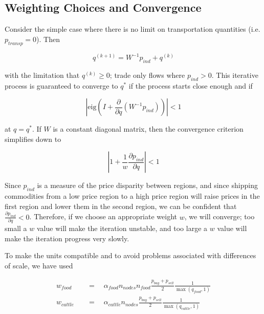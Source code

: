 \documentclass[letter,12pt]{article}
\begin{document}
\subsection{Weighting Choices and Convergence}

Consider the simple case where there is no limit on transportation quantities (i.e. $p_{transp} = 0$).  Then

\begin{equation}
q^{\left(k+1\right)} = W^{-1} p_{ind} + q^{\left(k\right)}
\end{equation}

\noindent with the limitation that $q^{\left(k\right)} \geq 0$; trade only flows where $p_{ind} > 0$.  This iterative process is guaranteed to converge to $q^*$ if the process starts close enough and if 

\begin{equation}
\left| \text{eig} \left(I + \frac{\partial}{\partial q} \left(W^{-1} p_{ind}\right) \right) \right| < 1
\end{equation}

\noindent at $q = q^*$.  If $W$ is a constant diagonal matrix, then the convergence criterion simplifies down to

\begin{equation}
\left| 1 + \frac{1}{w} \frac{\partial p_{ind}}{\partial q} \right| < 1
\end{equation}

Since $p_{ind}$ is a measure of the price disparity between regions, and since shipping commodities from a low price region to a high price region will raise prices in the first region and lower them in the second region, we can be confident that $\frac{\partial p_{ind}}{\partial q} < 0$.  Therefore, if we choose an appropriate weight $w$, we will converge; too small a $w$ value will make the iteration unstable, and too large a $w$ value will make the iteration progress very slowly.

To make the units compatible and to avoid problems associated with differences of scale, we have used

\begin{align}
w_{food} \quad &= \quad  \alpha_{food} n_{nodes} n_{food} \frac{p_{buy} + p_{sell}}{2} \frac{1}{\max \left(q_{food},1 \right)} \\
w_{cattle} \quad &= \quad  \alpha_{cattle} n_{nodes} \frac{p_{buy} + p_{sell}}{2} \frac{1}{\max \left(q_{cattle},1 \right)}
\end{align}
\end{document}
